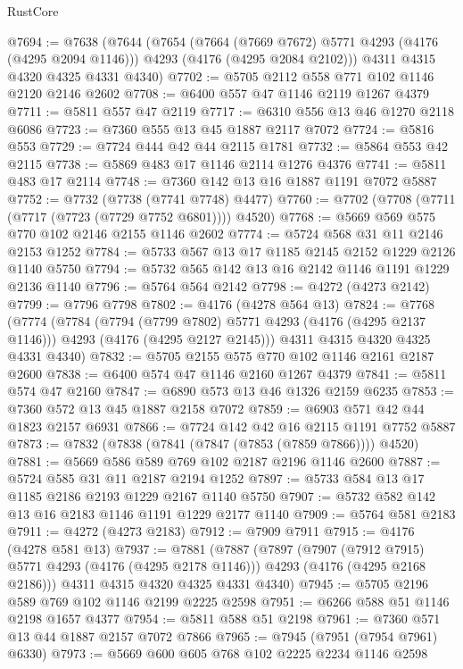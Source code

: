 \begin{lexlean}{RustCore}
\begin{coremodule}
@7694 := @7638
    (@7644
      (@7654
        (@7664 (@7669 @7672) @5771 @4293 (@4176 (@4295 @2094 @1146)))
        @4293
        (@4176 (@4295 @2084 @2102)))
      @4311
      @4315
      @4320
      @4325
      @4331
      @4340)
@7702 := @5705 @2112 @558 @771 @102 @1146 @2120 @2146 @2602
@7708 := @6400 @557 @47 @1146 @2119 @1267 @4379
@7711 := @5811 @557 @47 @2119
@7717 := @6310 @556 @13 @46 @1270 @2118 @6086
@7723 := @7360 @555 @13 @45 @1887 @2117 @7072
@7724 := @5816 @553
@7729 := @7724 @444 @42 @44 @2115 @1781
@7732 := @5864 @553 @42 @2115
@7738 := @5869 @483 @17 @1146 @2114 @1276 @4376
@7741 := @5811 @483 @17 @2114
@7748 := @7360 @142 @13 @16 @1887 @1191 @7072 @5887
@7752 := @7732 (@7738 (@7741 @7748) @4477)
@7760 := @7702 (@7708 (@7711 (@7717 (@7723 (@7729 @7752 @6801)))) @4520)
@7768 := @5669 @569 @575 @770 @102 @2146 @2155 @1146 @2602
@7774 := @5724 @568 @31 @11 @2146 @2153 @1252
@7784 := @5733 @567 @13 @17 @1185 @2145 @2152 @1229 @2126 @1140 @5750
@7794 := @5732 @565 @142 @13 @16 @2142 @1146 @1191 @1229 @2136 @1140
@7796 := @5764 @564 @2142
@7798 := @4272 (@4273 @2142)
@7799 := @7796 @7798
@7802 := @4176 (@4278 @564 @13)
@7824 := @7768
    (@7774
      (@7784
        (@7794 (@7799 @7802) @5771 @4293 (@4176 (@4295 @2137 @1146)))
        @4293
        (@4176 (@4295 @2127 @2145)))
      @4311
      @4315
      @4320
      @4325
      @4331
      @4340)
@7832 := @5705 @2155 @575 @770 @102 @1146 @2161 @2187 @2600
@7838 := @6400 @574 @47 @1146 @2160 @1267 @4379
@7841 := @5811 @574 @47 @2160
@7847 := @6890 @573 @13 @46 @1326 @2159 @6235
@7853 := @7360 @572 @13 @45 @1887 @2158 @7072
@7859 := @6903 @571 @42 @44 @1823 @2157 @6931
@7866 := @7724 @142 @42 @16 @2115 @1191 @7752 @5887
@7873 := @7832 (@7838 (@7841 (@7847 (@7853 (@7859 @7866)))) @4520)
@7881 := @5669 @586 @589 @769 @102 @2187 @2196 @1146 @2600
@7887 := @5724 @585 @31 @11 @2187 @2194 @1252
@7897 := @5733 @584 @13 @17 @1185 @2186 @2193 @1229 @2167 @1140 @5750
@7907 := @5732 @582 @142 @13 @16 @2183 @1146 @1191 @1229 @2177 @1140
@7909 := @5764 @581 @2183
@7911 := @4272 (@4273 @2183)
@7912 := @7909 @7911
@7915 := @4176 (@4278 @581 @13)
@7937 := @7881
    (@7887
      (@7897
        (@7907 (@7912 @7915) @5771 @4293 (@4176 (@4295 @2178 @1146)))
        @4293
        (@4176 (@4295 @2168 @2186)))
      @4311
      @4315
      @4320
      @4325
      @4331
      @4340)
@7945 := @5705 @2196 @589 @769 @102 @1146 @2199 @2225 @2598
@7951 := @6266 @588 @51 @1146 @2198 @1657 @4377
@7954 := @5811 @588 @51 @2198
@7961 := @7360 @571 @13 @44 @1887 @2157 @7072 @7866
@7965 := @7945 (@7951 (@7954 @7961) @6330)
@7973 := @5669 @600 @605 @768 @102 @2225 @2234 @1146 @2598

\end{coremodule}
\end{lexlean}
